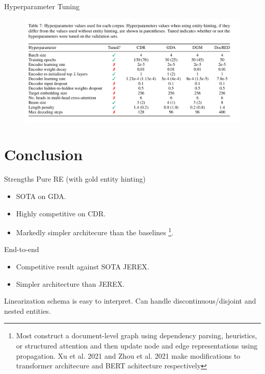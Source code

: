 \documentclass[usenames,dvipsnames,pdf]{beamer}
\begin{document}
        \begin{frame}{Hyperparameter Tuning}
          \begin{figure}
            \includegraphics[width=1.0\textwidth,height=1.0\textheight,keepaspectratio]{hyperparameters} 
          \end{figure}
        \end{frame}
        
        \section{Conclusion}

        \begin{frame}{Strengths}
          Pure RE (with gold entity hinting)
          \begin{itemize}
          \item
            SOTA on GDA.
          \item
            Highly competitive on CDR.
          \item
            Markedly simpler architecure than the baselines
            \footnote{Most construct
            a document-level graph using dependency parsing,
            heuristics, or structured attention and then update
            node and edge representations using propagation.
            Xu et al. 2021 and Zhou et al. 2021 make modifications
            to transformer architecure and BERT achitecture respectively}.  
          \end{itemize}
          End-to-end
          \begin{itemize}
          \item
            Competitive result against SOTA JEREX.
          \item
            Simpler architecture than JEREX.
          \end{itemize}
          Linearization schema is easy to interpret.
          Can handle discontinuous/disjoint and nested entities.
        \end{frame}
\end{document}
